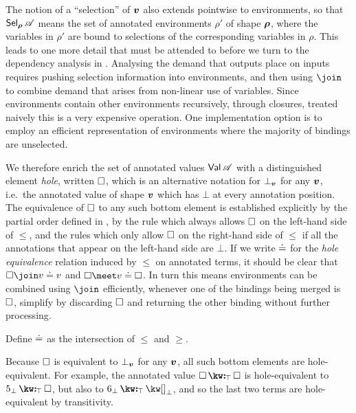 The notion of a ``selection'' of $\bm{v}$ also extends pointwise to environments, so that $\textup{\textsf{Sel}}_{\bm{\rho}}\,{\mathscr{A}}$ means the set of annotated environments $\rho'$ of shape $\bm{\rho}$, where the variables in $\rho'$ are bound to selections of the corresponding variables in $\rho$. This leads to one more detail that must be attended to before we turn to the dependency analysis in . Analysing the demand that outputs place on inputs requires pushing selection information into environments, and then using $\join$ to combine demand that arises from non-linear use of variables. Since environments contain other environments recursively, through closures, treated naively this is a very expensive operation. One implementation option is to employ an efficient representation of environments where the majority of bindings are unselected.

We therefore enrich the set of annotated values $\textup{\textsf{Val}}\,{\mathscr{A}}$ with a distinguished element \emph{hole}, written $\square$, which is an alternative notation for $\bot_{\bm{v}}$ for any $\bm{v}$, i.e.~the annotated value of shape $\bm{v}$ which has $\bot$ at every annotation position. The equivalence of $\square$ to any such bottom element is established explicitly by the partial order defined in , by the rule which always allows $\square$ on the left-hand side of $\leq$, and the rules which only allow $\square$ on the right-hand side of $\leq$ if all the annotations that appear on the left-hand side are $\bot$. If we write $\doteq$ for the \emph{hole equivalence} relation induced by $\leq$ on annotated terms, it should be clear that $\hole \join v \eq v$ and $\hole \meet v \eq \hole$. In turn this means environments can be combined using $\join$ efficiently, whenever one of the bindings being merged is $\square$, simplify by discarding $\square$ and returning the other binding without further processing.

\begin{definition}
   Define $\doteq$ as the intersection of $\leq$ and $\geq$.
\end{definition}

Because $\square$ is equivalent to $\bot_{\bm{v}}$ for any $\bm{v}$, all such bottom elements are hole-equivalent. For example, the annotated value $\annCons{\hole}{\hole}{\top}$ is hole-equivalent to $\annCons{5_{\bot}}{\hole}{\top}$, but also to $\annCons{6_{\bot}}{{\exNil_{\bot}}}{\top}$, and so the last two terms are hole-equivalent by transitivity.

